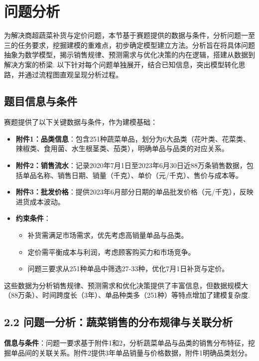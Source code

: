 \documentclass{cumcmthesis} %
\begin{document}
\section{问题分析}

为解决商超蔬菜补货与定价问题，本节基于赛题提供的数据与条件，分析问题一至三的任务要求，挖掘建模的重难点，初步确定模型建立方法。分析旨在将具体问题抽象为数学模型，揭示销售规律、预测需求与优化决策的内在逻辑，搭建从数据到解决方案的桥梁\cite{winston2004operations}. 以下针对每个问题单独展开，结合已知信息，突出模型转化思路，并通过流程图直观呈现分析过程。

\subsection{题目信息与条件}

赛题提供了以下关键数据与条件，作为建模基础：

\begin{itemize}
\item \textbf{附件1：品类信息}：包含251种蔬菜单品，划分为6大品类（花叶类、花菜类、辣椒类、食用菌、水生根茎类、茄类），明确单品与品类的对应关系。
\item \textbf{附件2：销售流水}：记录2020年7月1日至2023年6月30日近88万条销售数据，包括单品名称、销售日期、销量（千克）、单价（元/千克）、售价与成本等。
\item \textbf{附件3：批发价格}：提供2023年6月部分日期的单品批发价格（元/千克），反映进货成本波动。
\item \textbf{约束条件}：
\begin{itemize}
\item 补货需满足市场需求，优先考虑高销量单品与品类。
\item 定价需平衡成本与利润，考虑顾客购买力和市场竞争。
\item 问题三要求从251种单品中筛选27-33种，优化7月1日补货与定价。
\end{itemize}
\end{itemize}

这些数据为分析销售规律、预测需求和优化决策提供了丰富信息，但数据规模大（88万条）、时间跨度长（3年）、单品种类多（251种）等特点增加了建模复杂度\cite{winston2004operations}.

\subsection*{2.2 问题一分析：蔬菜销售的分布规律与关联分析}

\textbf{信息与条件}：问题一要求基于附件1和2，分析蔬菜单品与品类的销售分布特征，挖掘单品间的关联关系。附件2提供3年单品销量与价格数据，附件1明确品类划分。
\end{document}
